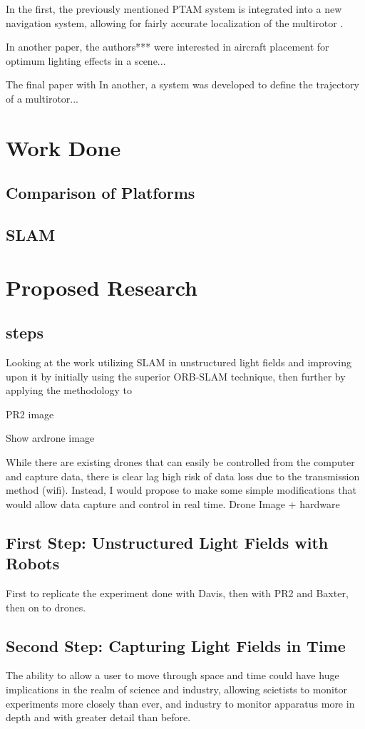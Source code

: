 \documentclass[12pt]{report}
\begin{document}
In the first, the previously mentioned PTAM system is integrated into a new navigation system, allowing for fairly accurate localization of the multirotor \cite{Engel12}.

In another paper, the authors*** were interested in aircraft placement for optimum lighting effects in a scene... \cite{Srikanth14}

The final paper with In another, a system was developed to define the trajectory of a multirotor... \cite{Roberts16}



\chapter*{Work Done}
\section*{Comparison of Platforms}
\section*{SLAM}

\chapter*{Proposed Research}
\section*{steps}
Looking at the work utilizing SLAM in unstructured light fields and improving upon it by initially using the superior ORB-SLAM technique, then further by applying the methodology to 

PR2 image

Show ardrone image

While there are existing drones that can easily be controlled from the computer and capture data, there is clear lag high risk of data loss due to the transmission method (wifi). Instead, I would propose to make some simple modifications that would allow data capture and control in real time.
Drone Image + hardware

\section{First Step: Unstructured Light Fields with Robots}
First to replicate the experiment done with Davis, then with PR2 and Baxter, then on to drones.

\section{Second Step: Capturing Light Fields in Time}
The ability to allow a user to move through space and time could have huge implications in the realm of science and industry, allowing scietists to monitor experiments more closely than ever, and industry to monitor apparatus more in depth and with greater detail than before.
\end{document}
